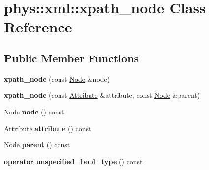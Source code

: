 \hypertarget{classphys_1_1xml_1_1xpath__node}{
\section{phys::xml::xpath\_\-node Class Reference}
\label{d3/d5a/classphys_1_1xml_1_1xpath__node}
}
\subsection*{Public Member Functions}
\begin{DoxyCompactItemize}
\item 
\hypertarget{classphys_1_1xml_1_1xpath__node_ae8586a1e290478eb0da5831410ca06a6}{
{\bfseries xpath\_\-node} (const \hyperlink{classphys_1_1xml_1_1Node}{Node} \&node)}
\label{d3/d5a/classphys_1_1xml_1_1xpath__node_ae8586a1e290478eb0da5831410ca06a6}

\item 
\hypertarget{classphys_1_1xml_1_1xpath__node_a15b9c887277cfb9ef110a9335077e8a2}{
{\bfseries xpath\_\-node} (const \hyperlink{classphys_1_1xml_1_1Attribute}{Attribute} \&attribute, const \hyperlink{classphys_1_1xml_1_1Node}{Node} \&parent)}
\label{d3/d5a/classphys_1_1xml_1_1xpath__node_a15b9c887277cfb9ef110a9335077e8a2}

\item 
\hypertarget{classphys_1_1xml_1_1xpath__node_a90d8cba65880a6af27db3bc8bf76d3dc}{
\hyperlink{classphys_1_1xml_1_1Node}{Node} {\bfseries node} () const }
\label{d3/d5a/classphys_1_1xml_1_1xpath__node_a90d8cba65880a6af27db3bc8bf76d3dc}

\item 
\hypertarget{classphys_1_1xml_1_1xpath__node_a388592e4ce48076d89193bd7a7eb16f1}{
\hyperlink{classphys_1_1xml_1_1Attribute}{Attribute} {\bfseries attribute} () const }
\label{d3/d5a/classphys_1_1xml_1_1xpath__node_a388592e4ce48076d89193bd7a7eb16f1}

\item 
\hypertarget{classphys_1_1xml_1_1xpath__node_aa16b44e4f4e59e2ed0ea588956b77bd7}{
\hyperlink{classphys_1_1xml_1_1Node}{Node} {\bfseries parent} () const }
\label{d3/d5a/classphys_1_1xml_1_1xpath__node_aa16b44e4f4e59e2ed0ea588956b77bd7}

\item 
\hypertarget{classphys_1_1xml_1_1xpath__node_ab756152ed44ef1f54e221b02444c58ec}{
{\bfseries operator unspecified\_\-bool\_\-type} () const }
\label{d3/d5a/classphys_1_1xml_1_1xpath__node_ab756152ed44ef1f54e221b02444c58ec}


\end{DoxyCompactItemize}
